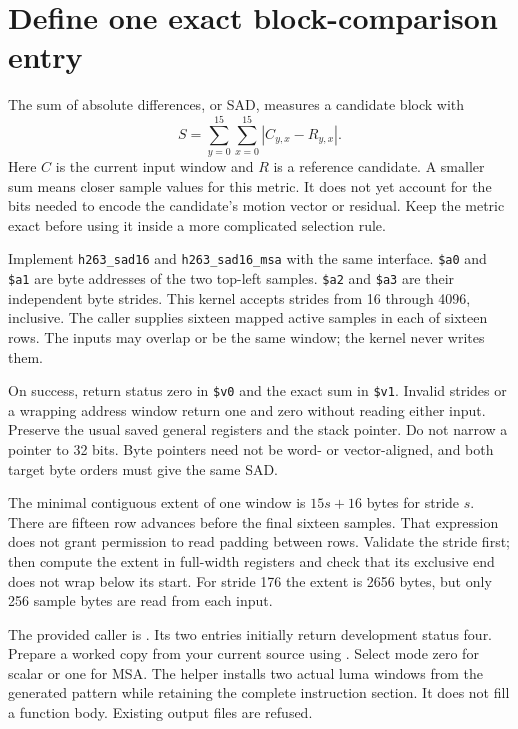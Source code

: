 \section{Define one exact block-comparison entry}
The sum of absolute differences, or SAD, measures a candidate block with
\[
  S=\sum_{y=0}^{15}\sum_{x=0}^{15}\left|C_{y,x}-R_{y,x}\right|.
\]
Here $C$ is the current input window and $R$ is a reference candidate. A smaller
sum means closer sample values for this metric. It does not yet account for the
bits needed to encode the candidate's motion vector or residual. Keep the metric
exact before using it inside a more complicated selection rule.

Implement \texttt{h263\_sad16} and \texttt{h263\_sad16\_msa} with the same interface.
\texttt{\$a0} and \texttt{\$a1} are byte addresses of the two top-left samples.
\texttt{\$a2} and \texttt{\$a3} are their independent byte strides. This kernel
accepts strides from 16 through 4096, inclusive. The caller supplies sixteen
mapped active samples in each of sixteen rows. The inputs may overlap or be the
same window; the kernel never writes them.

On success, return status zero in \texttt{\$v0} and the exact sum in
\texttt{\$v1}. Invalid strides or a wrapping address window return one and zero
without reading either input. Preserve the usual saved general registers and
the stack pointer. Do not narrow a pointer to 32 bits. Byte pointers need not be
word- or vector-aligned, and both target byte orders must give the same SAD.

The minimal contiguous extent of one window is $15s+16$ bytes for stride $s$.
There are fifteen row advances before the final sixteen samples. That expression
does not grant permission to read padding between rows. Validate the stride first;
then compute the extent in full-width registers and check that its exclusive end
does not wrap below its start. For stride 176 the extent is 2656 bytes, but only
256 sample bytes are read from each input.

The provided caller is . Its two
entries initially return development status four. Prepare a worked copy from your
current source using . Select mode
zero for scalar or one for MSA. The helper installs two actual luma windows from
the generated pattern while retaining the complete instruction section. It does
not fill a function body. Existing output files are refused.

